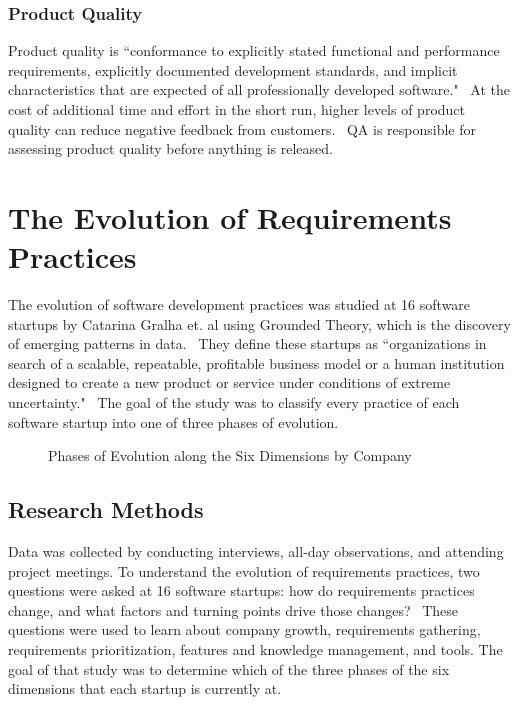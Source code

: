 \documentclass{sig-alternate}
\begin{document}
\subsubsection{Product Quality}
Product quality is ``conformance to explicitly stated functional and performance requirements, explicitly documented development standards, and implicit characteristics that are expected of all professionally developed software."~\cite{Pressman:2004} At the cost of additional time and effort in the short run, higher levels of product quality can reduce negative feedback from customers.~\cite{Gralha:2018} QA is responsible for assessing product quality before anything is released.

\section{The Evolution of Requirements Practices}
\label{sec:practicesEvolution}
The evolution of software development practices was studied at 16 software startups by Catarina Gralha et. al using Grounded Theory, which is the discovery of emerging patterns in data.~\cite{Gralha:2018} They define these startups as ``organizations in search of a scalable, repeatable, profitable business model or a human institution designed to create a new product or service under conditions of extreme uncertainty."~\cite{Gralha:2018} The goal of the study was to classify every practice of each software startup into one of three phases of evolution.

\begin{figure}
\centering
{}
\caption{Phases of Evolution along the Six Dimensions by Company}
\label{fig:companiesEvolution}
\end{figure}

\subsection{Research Methods}
\label{sec:researchMethods}
Data was collected by conducting interviews, all-day observations, and attending project meetings. To understand the evolution of requirements practices, two questions were asked at 16 software startups: how do requirements practices change, and what factors and turning points drive those changes?~\cite{Gralha:2018} These questions were used to learn about company growth, requirements gathering, requirements prioritization, features and knowledge management, and tools. The goal of that study was to determine which of the three phases of the six dimensions that each startup is currently at. 
\end{document}
